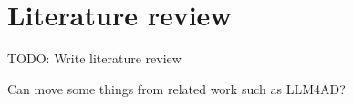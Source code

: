 \chapter{Literature review}

TODO: Write literature review

Can move some things from related work such as LLM4AD?